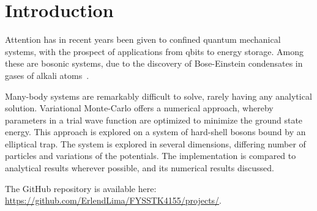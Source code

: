 \section{Introduction}

Attention has in recent years been given to confined quantum mechanical systems,
with the prospect of applications from qbits to energy storage. Among these
are bosonic systems, due to the discovery of Bose-Einstein condensates in gases
of alkali atoms~\cite{Nilsen2005}.\newline

Many-body systems are remarkably difficult to solve, rarely having any
analytical solution. Variational Monte-Carlo offers a numerical approach,
whereby parameters in a trial wave function are optimized to minimize the ground
state energy. This approach is explored on a system of hard-shell bosons bound by an
elliptical trap. The system is explored in several dimensions, differing number
of particles and variations of the potentials. The implementation is compared
to analytical results wherever possible, and its numerical results discussed.
\newline

The GitHub repository is available here: \url{https://github.com/ErlendLima/FYSSTK4155/projects/}.

